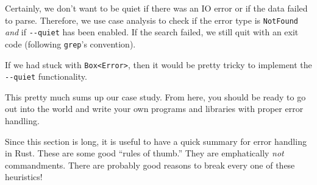 \documentclass[a4paper,]{book}
\begin{document}
Certainly, we don't want to be quiet if there was an IO error or if the
data failed to parse. Therefore, we use case analysis to check if the
error type is \texttt{NotFound} \emph{and} if \texttt{-\/-quiet} has
been enabled. If the search failed, we still quit with an exit code
(following \texttt{grep}'s convention).

If we had stuck with \texttt{Box\textless{}Error\textgreater{}}, then it
would be pretty tricky to implement the \texttt{-\/-quiet}
functionality.

This pretty much sums up our case study. From here, you should be ready
to go out into the world and write your own programs and libraries with
proper error handling.


Since this section is long, it is useful to have a quick summary for
error handling in Rust. These are some good ``rules of thumb.'' They are
emphatically \emph{not} commandments. There are probably good reasons to
break every one of these heuristics!
\end{document}
